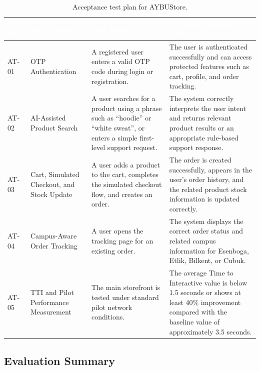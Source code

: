 \documentclass[11pt,a4paper]{article}
\begin{document}
\renewcommand{\arraystretch}{1.25}
\begin{table}[H]
\centering
\small
\begin{tabularx}{\textwidth}{|p{}|p{}|X|X|}
\hline
\rowcolor{aybuHeader}
\textcolor{white}{\textbf{Test ID}} &
\textcolor{white}{\textbf{Test Scenario}} &
\textcolor{white}{\textbf{Test Description}} &
\textcolor{white}{\textbf{Expected Success Criteria}} \\
\hline

AT-01 &
OTP Authentication &
A registered user enters a valid OTP code during login or registration. &
The user is authenticated successfully and can access protected
features such as cart, profile, and order tracking. \\
\hline

AT-02 &
AI-Assisted Product Search &
A user searches for a product using a phrase such as ``hoodie'' or
``white sweat'', or enters a simple first-level support request. &
The system correctly interprets the user intent and returns relevant
product results or an appropriate rule-based support response. \\
\hline

AT-03 &
Cart, Simulated Checkout, and Stock Update &
A user adds a product to the cart, completes the simulated checkout
flow, and creates an order. &
The order is created successfully, appears in the user's order history,
and the related product stock information is updated correctly. \\
\hline

AT-04 &
Campus-Aware Order Tracking &
A user opens the tracking page for an existing order. &
The system displays the correct order status and related campus
information for Esenboga, Etlik, Bilkent, or Cubuk. \\
\hline

AT-05 &
TTI and Pilot Performance Measurement &
The main storefront is tested under standard pilot network conditions. &
The average Time to Interactive value is below 1.5 seconds or shows at
least 40\% improvement compared with the baseline value of
approximately 3.5 seconds. \\
\hline

\end{tabularx}
\caption{Acceptance test plan for AYBUStore.}
\label{tab:acceptance-tests-39}
\end{table}

\subsection{Evaluation Summary}
\end{document}
